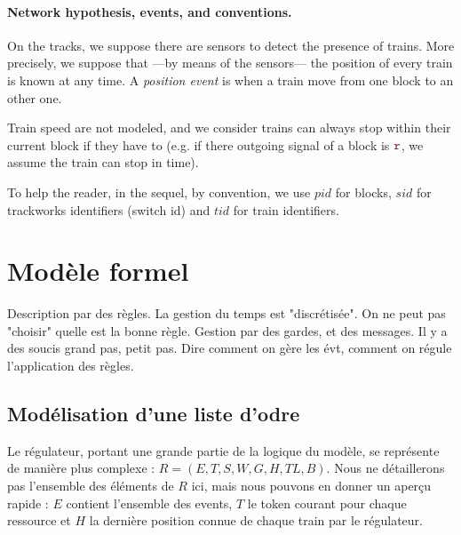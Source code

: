 \documentclass[runningheads]{llncs}
\newcommand{\sigred}{{\mbox{${\color{red!50!black}\mathtt{r}}$}}\xspace}
\begin{document}



\paragraph{Network hypothesis, events, and conventions.}
On the tracks, we suppose there are sensors to detect the presence of trains. More precisely, we suppose that ---by means of the sensors--- the position of every train is known at any time. A \emph{position event} is when a train move from one block to an other one. 

Train speed are not modeled, and we consider trains can always stop within their current block if they have to (e.g. if there outgoing signal of a block is \sigred, we assume the train can stop in time).


To help the reader, in the sequel, by convention, we use $pid$ for blocks, $sid$ for trackworks identifiers (switch id) and $tid$ for train identifiers.  

\section{Modèle formel}
\label{sec:formal-model}

Description par des règles. La gestion du temps est "discrétisée". On ne peut pas "choisir" quelle est la bonne règle. Gestion par des gardes, et des messages. Il y a des soucis grand pas, petit pas. Dire comment on gère les évt, comment on régule l'application des règles. 

\subsection{Modélisation d'une liste d'odre}
Le régulateur, portant une grande partie de la logique du modèle, se représente de manière plus complexe : $R = (E,T,S,W,G,H,TL,B)$.
Nous ne détaillerons pas l'ensemble des éléments de $R$ ici, mais nous pouvons en donner un aperçu rapide : $E$ contient l'ensemble des events,
$T$ le token courant pour chaque ressource et $H$ la dernière position connue de chaque train par le régulateur.
\end{document}
